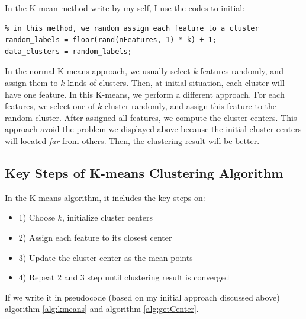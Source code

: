 \documentclass[12pt]{article}
\begin{document}
In the K-mean method write by my self, I use the codes to initial:

\begin{lstlisting}
% in this method, we random assign each feature to a cluster
random_labels = floor(rand(nFeatures, 1) * k) + 1;
data_clusters = random_labels;
\end{lstlisting}

In the normal K-means approach, we usually select $k$ features randomly, and assign them to $k$ kinds of clusters. Then, at initial situation, each cluster will have one feature. In this K-means, we perform a different approach. For each features, we select one of $k$ cluster randomly, and assign this feature to the random cluster. After assigned all features, we compute the cluster centers. This approach avoid the problem we displayed above because the initial cluster centers will located \textit{far} from others. Then, the clustering result will be better.

\subsection{Key Steps of K-means Clustering Algorithm}

In the K-means algorithm, it includes the key steps on:

\begin{itemize}
  \item 1) Choose $k$, initialize cluster centers
  \item 2) Assign each feature to its closest center
  \item 3) Update the cluster center as the mean points  
  \item 4) Repeat $2$ and $3$ step until clustering result is converged 
\end{itemize}

If we write it in pseudocode (based on my initial approach discussed above) algorithm \ref{alg:kmeans} and algorithm \ref{alg:getCenter}.
\end{document}
